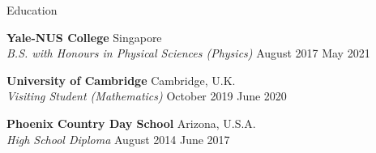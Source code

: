 \documentclass{resume} %
\begin{document}
\begin{rSection}{Education}
%

{\bf \large  Yale-NUS College} \hfill { Singapore}\\
{\em B.S. with Honours in Physical Sciences (Physics)} \hfill { August 2017 {\textendash}  May 2021}

{\bf \large  University of Cambridge} \hfill {Cambridge, U.K.}\\
{\em Visiting Student (Mathematics)} \hfill {October 2019 {\textendash}  June 2020}


{\bf \large  Phoenix Country Day School} \hfill { Arizona, U.S.A.}\\
{\em High School Diploma} \hfill { August 2014 {\textendash}  June 2017}




\end{rSection}




\end{document}
